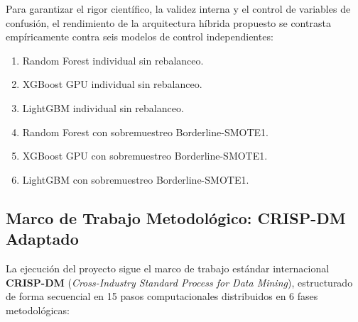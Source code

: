 Para garantizar el rigor científico, la validez interna y el control de variables de confusión, el rendimiento de la arquitectura híbrida propuesto se contrasta empíricamente contra seis modelos de control independientes:
\begin{enumerate}
    \item Random Forest individual sin rebalanceo.
    \item XGBoost GPU individual sin rebalanceo.
    \item LightGBM individual sin rebalanceo.
    \item Random Forest con sobremuestreo Borderline-SMOTE1.
    \item XGBoost GPU con sobremuestreo Borderline-SMOTE1.
    \item LightGBM con sobremuestreo Borderline-SMOTE1.
\end{enumerate}

\subsection{Marco de Trabajo Metodológico: CRISP-DM Adaptado}
La ejecución del proyecto sigue el marco de trabajo estándar internacional \textbf{CRISP-DM} (\textit{Cross-Industry Standard Process for Data Mining}), estructurado de forma secuencial en 15 pasos computacionales distribuidos en 6 fases metodológicas:

